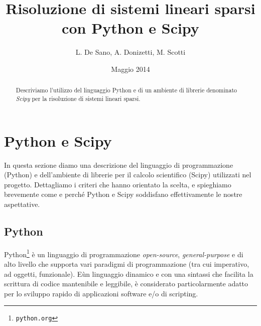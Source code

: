 \documentclass[11pt,a4paper]{scrartcl}
\author{L. De Sano, A. Donizetti, M. Scotti}
\title{Risoluzione di sistemi lineari sparsi \\con Python e Scipy}
\date{Maggio 2014}
\begin{document}
\maketitle
\begin{abstract}
Descriviamo l'utilizzo del linguaggio Python e di un ambiente di librerie denominato \emph{Scipy} per la risoluzione di sistemi lineari sparsi.
\end{abstract}

\section*{Python e Scipy}

In questa sezione diamo una descrizione del linguaggio di programmazione (Python) e dell'ambiente di librerie per il calcolo scientifico (Scipy) utilizzati nel progetto. Dettagliamo i criteri che hanno orientato la scelta, e spieghiamo brevemente come e perché Python e Scipy soddisfano effettivamente le nostre aspettative.

\subsection*{Python}

Python\footnote{\texttt{python.org}} è un linguaggio di programmazione \emph{open-source}, \emph{general-purpose} e di alto livello che supporta vari paradigmi di programmazione (tra cui imperativo, ad oggetti, funzionale). E\` un linguaggio dinamico e con una sintassi che facilita la scrittura di codice mantenibile e leggibile, è considerato particolarmente adatto per lo sviluppo rapido di applicazioni software e/o di scripting.
\end{document}
